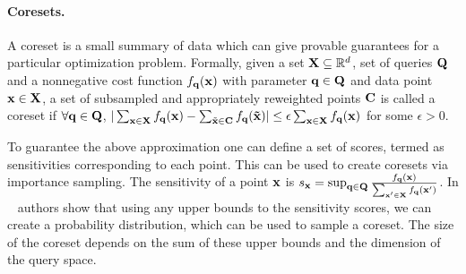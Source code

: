 \paragraph{Coresets.}
A coreset is a small summary of data which can give provable guarantees for a particular optimization problem. Formally, given a set
$\mathbf{X} \subseteq \mathbb{R}^d$, set of queries $\mathbf{Q}$ and a nonnegative cost function $\mathnormal{f}_{\mathbf{q}}(\mathbf{x})$ with parameter $\mathbf{q} \in \mathbf{Q}$ and data point $\mathbf{x} \in \mathbf{X}$, a set of subsampled and appropriately reweighted points $\mathbf{C}$ is called a coreset if $\forall \mathbf{q} \in \mathbf{Q}$,  $|\sum_{\mathbf{x} \in \mathbf{X}}\mathnormal{f}_{\mathbf{q}}(\mathbf{x}) - \sum_{\tilde{\mathbf{x}} \in \mathbf{C}}\mathnormal{f}_{\mathbf{q}}(\mathbf{\tilde{x}})| \leq \epsilon\sum_{\mathbf{x} \in \mathbf{X}}\mathnormal{f}_{\mathbf{q}}(\mathbf{x})$ for some $\epsilon > 0$.

To guarantee the above approximation one can define a set of scores, termed as sensitivities \cite{langberg2010universal} corresponding to each point. This can be used to create coresets via importance sampling. The sensitivity of a point $ \mathbf{x} $ is $s_{\mathbf{x}} = \sup_{\mathbf{q} \in \mathbf{Q}} \frac{ \mathnormal{f}_{\mathbf{q}}(\mathbf{x})}{\sum_{\mathbf{x}' \in \mathbf{X}} \mathnormal{f}_{\mathbf{q}}(\mathbf{x}')}$. In ~\cite{langberg2010universal} authors show that using any upper bounds to the sensitivity scores, we can create a probability distribution, which can be used to sample a coreset. The size of the coreset depends on the sum of these upper bounds and the dimension of the query space.